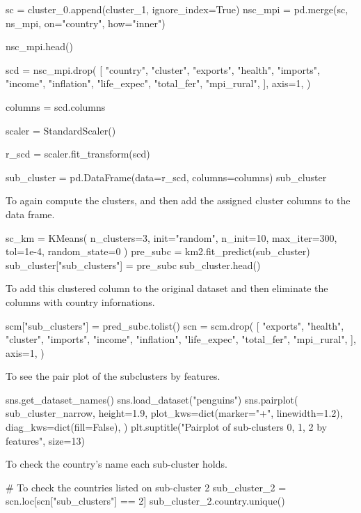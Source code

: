 \documentclass{swfuthesise}
\begin{document}
\begin{pythoncode}
sc = cluster_0.append(cluster_1, ignore_index=True)
nsc_mpi = pd.merge(sc, ns_mpi, on="country", how="inner")

nsc_mpi.head()

scd = nsc_mpi.drop(
    [
        "country",
        "cluster",
        "exports",
        "health",
        "imports",
        "income",
        "inflation",
        "life_expec",
        "total_fer",
        "mpi_rural",
    ],
    axis=1,
)


columns = scd.columns

scaler = StandardScaler()

r_scd = scaler.fit_transform(scd)

sub_cluster = pd.DataFrame(data=r_scd, columns=columns)
sub_cluster
\end{pythoncode}

To again compute the clusters, and then add the assigned cluster columns to the data frame.

\begin{pythoncode}
sc_km = KMeans(
    n_clusters=3, init="random", n_init=10, max_iter=300, tol=1e-4, random_state=0
)
pre_subc = km2.fit_predict(sub_cluster)
sub_cluster["sub_clusters"] = pre_subc
sub_cluster.head()
\end{pythoncode}

To add this clustered column to the original dataset and then eliminate the columns with country infornations.

\begin{pythoncode}
scm["sub_clusters"] = pred_subc.tolist()
scn = scm.drop(
    [
        "exports",
        "health",
        "cluster",
        "imports",
        "income",
        "inflation",
        "life_expec",
        "total_fer",
        "mpi_rural",
    ],
    axis=1,
)
\end{pythoncode}

To see the pair plot of the subclusters by features.

\begin{pythoncode}
sns.get_dataset_names()
sns.load_dataset("penguins")
sns.pairplot(
    sub_cluster_narrow,
    height=1.9,
    plot_kws=dict(marker="+", linewidth=1.2),
    diag_kws=dict(fill=False),
)
plt.suptitle("Pairplot of sub-clusters 0, 1, 2 by features", size=13)
\end{pythoncode}

To check the country's name each sub-cluster holds.

\begin{pythoncode}
# To check the countries listed on sub-cluster 2
sub_cluster_2 = scn.loc[scn["sub_clusters"] == 2]
sub_cluster_2.country.unique()
\end{pythoncode}
\end{document}
